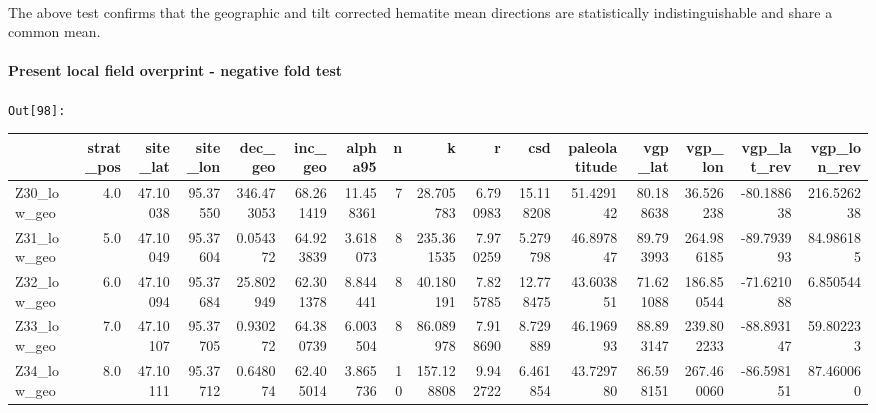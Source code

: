 \documentclass[11pt]{article}
\begin{document}
    \begin{center}
    \end{center}
    { \hspace*{\fill} \\}
    
    The above test confirms that the geographic and tilt corrected hematite
mean directions are statistically indistinguishable and share a common
mean.

    \paragraph{Present local field overprint - negative fold
test}\label{present-local-field-overprint---negative-fold-test}

\texttt{\color{outcolor}Out[{\color{outcolor}98}]:}
    
    \begin{sidewaystable}
    {\tiny\begin{tabular}{lrrrrrrrrrrrrrrr}
\toprule
{} &  strat\_pos &  site\_lat &  site\_lon &     dec\_geo &    inc\_geo &    alpha95 &   n &           k &         r &        csd &  paleolatitude &    vgp\_lat &     vgp\_lon &  vgp\_lat\_rev &  vgp\_lon\_rev \\
\midrule
Z30\_low\_geo &        4.0 &  47.10038 &  95.37550 &  346.473053 &  68.261419 &  11.458361 &   7 &   28.705783 &  6.790983 &  15.118208 &      51.429142 &  80.188638 &   36.526238 &   -80.188638 &   216.526238 \\
Z31\_low\_geo &        5.0 &  47.10049 &  95.37604 &    0.054372 &  64.923839 &   3.618073 &   8 &  235.361535 &  7.970259 &   5.279798 &      46.897847 &  89.793993 &  264.986185 &   -89.793993 &    84.986185 \\
Z32\_low\_geo &        6.0 &  47.10094 &  95.37684 &   25.802949 &  62.301378 &   8.844441 &   8 &   40.180191 &  7.825785 &  12.778475 &      43.603851 &  71.621088 &  186.850544 &   -71.621088 &     6.850544 \\
Z33\_low\_geo &        7.0 &  47.10107 &  95.37705 &    0.930272 &  64.380739 &   6.003504 &   8 &   86.089978 &  7.918690 &   8.729889 &      46.196993 &  88.893147 &  239.802233 &   -88.893147 &    59.802233 \\
Z34\_low\_geo &        8.0 &  47.10111 &  95.37712 &    0.648074 &  62.405014 &   3.865736 &  10 &  157.128808 &  9.942722 &   6.461854 &      43.729780 &  86.598151 &  267.460060 &   -86.598151 &    87.460060 \\
\bottomrule
\end{tabular}}
\end{sidewaystable}
    
\end{document}
